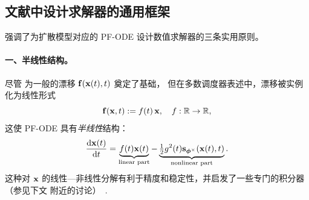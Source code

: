 

\subsection{文献中设计求解器的通用框架}\label{subsec:common_design_solvers}

\citet{zhang2022fast,zhang2023gddim} 强调了为扩散模型对应的 PF-ODE 设计数值求解器的三条实用原则。

\paragraph{一、半线性结构。}
尽管 \citet{song2020score} 为一般的漂移 ${\mathbf{f}}({\mathbf{x}}(t),t)$ 奠定了基础，
但在多数调度器表述中，漂移被实例化为线性形式
\[
{\mathbf{f}}({\mathbf{x}}, t) := f(t)\,{\mathbf{x}}, \quad f:\mathbb{R}\to\mathbb{R},
\]
这使 PF-ODE 具有\emph{半线性}结构：
\begin{equation}\label{eq:score_pf-ode}
    \frac{\mathop{}\!\mathrm{d}{\mathbf{x}}(t)}{\mathop{}\!\mathrm{d} t}
     = 
    \underbrace{f(t) {\mathbf{x}}(t)}_{\text{linear part}}
     - 
    \underbrace{\tfrac{1}{2} g^2(t) {\mathbf{s}}_{\bm{\phi}^\times}({\mathbf{x}}(t), t)}_{\text{nonlinear part}}.
\end{equation}
这种对 ${\mathbf{x}}$ 的线性—非线性分解有利于精度和稳定性，并启发了一些专门的积分器（参见下文  附近的讨论）~\citep{hochbruck2005explicit,hochbruck2010exponential}.



